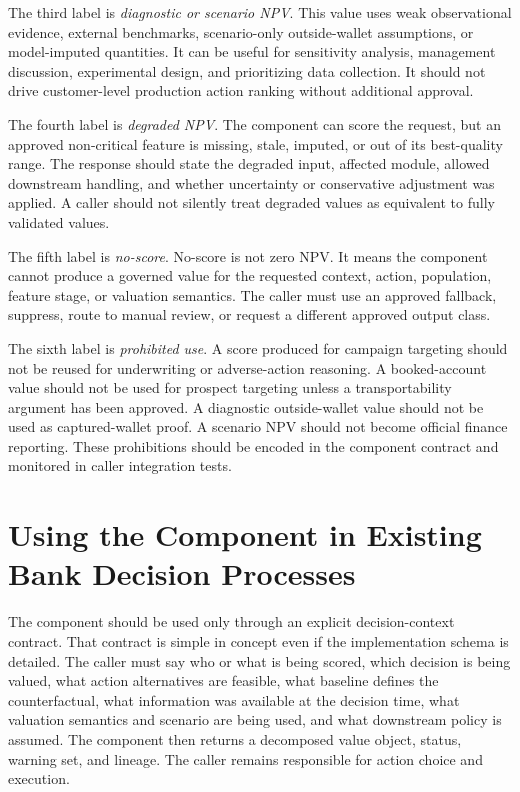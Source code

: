 \documentclass[11pt]{article}
\newcommand{\1}{\mathbf{1}}
\begin{document}
The third label is \emph{diagnostic or scenario NPV}. This value uses weak
observational evidence, external benchmarks, scenario-only outside-wallet
assumptions, or model-imputed quantities. It can be useful for sensitivity
analysis, management discussion, experimental design, and prioritizing data
collection. It should not drive customer-level production action ranking
without additional approval.

The fourth label is \emph{degraded NPV}. The component can score the request,
but an approved non-critical feature is missing, stale, imputed, or out of its
best-quality range. The response should state the degraded input, affected
module, allowed downstream handling, and whether uncertainty or conservative
adjustment was applied. A caller should not silently treat degraded values as
equivalent to fully validated values.

The fifth label is \emph{no-score}. No-score is not zero NPV. It means the
component cannot produce a governed value for the requested context, action,
population, feature stage, or valuation semantics. The caller must use an
approved fallback, suppress, route to manual review, or request a different
approved output class.

The sixth label is \emph{prohibited use}. A score produced for campaign
targeting should not be reused for underwriting or adverse-action reasoning. A
booked-account value should not be used for prospect targeting unless a
transportability argument has been approved. A diagnostic outside-wallet value
should not be used as captured-wallet proof. A scenario NPV should not become
official finance reporting. These prohibitions should be encoded in the
component contract and monitored in caller integration tests.

\section{Using the Component in Existing Bank Decision Processes}
\label{sec:decision-use}

The component should be used only through an explicit decision-context
contract. That contract is simple in concept even if the implementation schema
is detailed. The caller must say who or what is being scored, which decision is
being valued, what action alternatives are feasible, what baseline defines the
counterfactual, what information was available at the decision time, what
valuation semantics and scenario are being used, and what downstream policy is
assumed. The component then returns a decomposed value object, status, warning
set, and lineage. The caller remains responsible for action choice and
execution.
\end{document}
